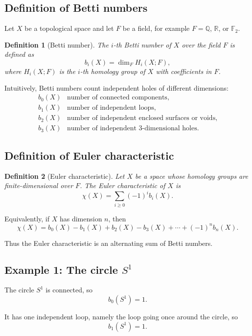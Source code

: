 \documentclass[12pt,a4paper]{article}
\theoremstyle{notespace}
\newtheorem{definition}{Definition}[section]
\begin{document}
\subsection{Definition of Betti numbers}

Let $X$ be a topological space and let $F$ be a field, for example
$F=\mathbb{Q}$, $\mathbb{R}$, or $\mathbb{F}_2$.

\begin{definition}[Betti number]
	The $i$-th Betti number of $X$ over the field $F$ is defined as
	\[
	b_i(X)=\dim_F H_i(X;F),
	\]
	where $H_i(X;F)$ is the $i$-th homology group of $X$ with coefficients in $F$.
\end{definition}

Intuitively, Betti numbers count independent holes of different dimensions:
\[
\begin{array}{c|l}
	b_0(X) & \text{number of connected components},\\
	b_1(X) & \text{number of independent loops},\\
	b_2(X) & \text{number of independent enclosed surfaces or voids},\\
	b_3(X) & \text{number of independent $3$-dimensional holes}.
\end{array}
\]

\subsection{Definition of Euler characteristic}

\begin{definition}[Euler characteristic]
	Let $X$ be a space whose homology groups are finite-dimensional over $F$.
	The Euler characteristic of $X$ is
	\[
	\chi(X)=\sum_{i\geq 0}(-1)^i b_i(X).
	\]
\end{definition}

Equivalently, if $X$ has dimension $n$, then
\[
\chi(X)
=
b_0(X)-b_1(X)+b_2(X)-b_3(X)+\cdots+(-1)^n b_n(X).
\]

Thus the Euler characteristic is an alternating sum of Betti numbers.

\subsection{Example 1: The circle $S^1$}

The circle $S^1$ is connected, so
\[
b_0(S^1)=1.
\]

It has one independent loop, namely the loop going once around the circle, so
\[
b_1(S^1)=1.
\]
\end{document}
